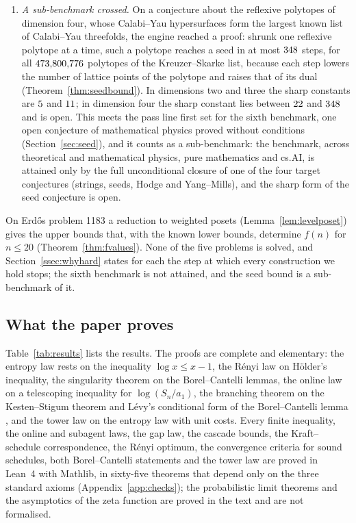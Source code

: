 \begin{enumerate}[label=(\roman*),leftmargin=1.8em,itemsep=1pt]
\item \emph{A sub-benchmark crossed.} On a conjecture about the reflexive polytopes of dimension four, whose Calabi--Yau hypersurfaces form the largest known list of Calabi--Yau threefolds, the engine reached a proof: shrunk one reflexive polytope at a time, such a polytope reaches a seed in at most $348$ steps, for all $473{,}800{,}776$ polytopes of the Kreuzer--Skarke list, because each step lowers the number of lattice points of the polytope and raises that of its dual (Theorem~\ref{thm:seedbound}). In dimensions two and three the sharp constants are $5$ and $11$; in dimension four the sharp constant lies between $22$ and $348$ and is open. This meets the pass line first set for the sixth benchmark, one open conjecture of mathematical physics proved without conditions (Section~\ref{sec:seed}), and it counts as a sub-benchmark: the benchmark, across theoretical and mathematical physics, pure mathematics and cs.AI, is attained only by the full unconditional closure of one of the four target conjectures (strings, seeds, Hodge and Yang--Mills), and the sharp form of the seed conjecture is open.
\end{enumerate}
On Erd\H{o}s problem 1183 a reduction to weighted posets (Lemma~\ref{lem:levelposet}) gives the upper bounds that, with the known lower bounds, determine $f(n)$ for $n\le20$ (Theorem~\ref{thm:fvalues}). None of the five problems is solved, and Section~\ref{ssec:whyhard} states for each the step at which every construction we hold stops; the sixth benchmark is not attained, and the seed bound is a sub-benchmark of it.

\subsection{What the paper proves}

Table~\ref{tab:results} lists the results. The proofs are complete and elementary: the entropy law rests on the inequality $\log x\le x-1$, the R\'enyi law on H\"older's inequality, the singularity theorem on the Borel--Cantelli lemmas, the online law on a telescoping inequality for $\log(S_{n}/a_{1})$, the branching theorem on the Kesten--Stigum theorem \cite{KS66} and L\'evy's conditional form of the Borel--Cantelli lemma \cite{Dur19}, and the tower law on the entropy law with unit costs. Every finite inequality, the online and subagent laws, the gap law, the cascade bounds, the Kraft--schedule correspondence, the R\'enyi optimum, the convergence criteria for sound schedules, both Borel--Cantelli statements and the tower law are proved in Lean~4 with Mathlib, in sixty-five theorems that depend only on the three standard axioms (Appendix~\ref{app:checks}); the probabilistic limit theorems and the asymptotics of the zeta function are proved in the text and are not formalised.

